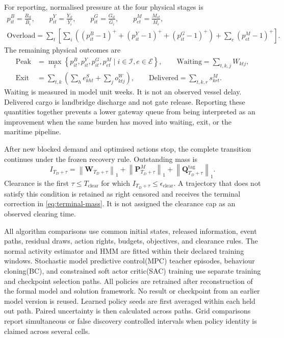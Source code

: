 \documentclass[a4paper,fleqn]{cas-sc}
\newcommand{\pos}[1]{\left(#1\right)^{+}}
\begin{document}
For reporting, normalised pressure at the four physical stages is
\begin{equation}
 \begin{gathered}
 p^B_{it}=\frac{B_{it}}{\bar B_i},\qquad
 p^Y_{it}=\frac{Y_{it}}{\bar Y_i},\qquad
 p^G_{it}=\frac{G_{it}}{\bar G_i},\qquad
 p^M_{et}=\frac{M_{et}}{\bar M_e},\\
 \mathrm{Overload}=\sum_t\left[
 \sum_i\left(\pos{p^B_{it}-1}+\pos{p^Y_{it}-1}
 +\pos{p^G_{it}-1}\right)
 +\sum_e\pos{p^M_{et}-1}\right].
 \end{gathered}
 \label{eq:experimental-pressure}
\end{equation}
The remaining physical outcomes are
\begin{equation}
 \begin{split}
 \mathrm{Peak}&=\max_{t}\left\{
 p^B_{it},p^Y_{it},p^G_{it},p^M_{et}\mid i\in\mathcal I,e\in\mathcal E
 \right\},\qquad
 \mathrm{Waiting}=\sum_{t,k,j}W_{ktj},\\
 \mathrm{Exit}&=\sum_{t,k}\left(\sum_he^S_{kht}+\sum_jo^W_{ktj}\right),
 \qquad
 \mathrm{Delivered}=\sum_{t,k,r}s^M_{krt}.
 \end{split}
 \label{eq:experimental-outcomes}
\end{equation}
Waiting is measured in model unit weeks. It is not an observed vessel delay.
Delivered cargo is landbridge discharge and not gate release. Reporting these
quantities together prevents a lower gateway queue from being interpreted as
an improvement when the same burden has moved into waiting, exit, or the
maritime pipeline.

After new blocked demand and optimised actions stop, the complete transition
continues under the frozen recovery rule. Outstanding mass is
\begin{equation}
 I_{T_D+\tau}=
 \left\|\mathbf W_{T_D+\tau}\right\|_1
 +\left\|\mathbf P^M_{T_D+\tau}\right\|_1
 +\left\|\mathbf Q^{\mathrm{tag}}_{T_D+\tau}\right\|_1.
 \label{eq:experimental-outstanding-mass}
\end{equation}
Clearance is the first $\tau\le T_{\mathrm{clear}}$ for which
$I_{T_D+\tau}\le\epsilon_{\mathrm{clear}}$. A trajectory that does not satisfy
this condition is retained as right censored and receives the terminal
correction in \cref{eq:terminal-mass}. It is not assigned the clearance cap as
an observed clearing time.

All algorithm comparisons use common initial states, released information,
event paths, residual draws, action rights, budgets, objectives, and clearance
rules. The normal activity estimator and HMM are fitted within their declared
training windows. Stochastic model predictive control(MPC) teacher episodes,
behaviour cloning(BC), and constrained soft actor critic(SAC) training use
separate training and checkpoint selection paths. All policies are retrained
after reconstruction of the formal model and solution framework. No result or checkpoint from
an earlier model version is reused. Learned policy seeds are first averaged
within each held out path. Paired uncertainty is then calculated across paths.
Grid comparisons report simultaneous or false discovery controlled intervals
when policy identity is claimed across several cells.
\end{document}
